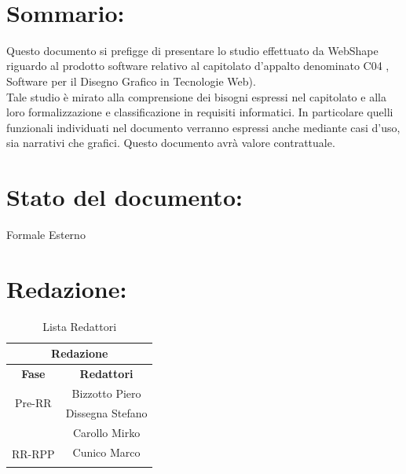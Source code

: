 \newpage


\begin{center} %
	\begin{Huge}	
				\textbf{\TITOLODOC}
			\\
	\end{Huge}
\end{center}
\parindent=18pt %
\section*{\LARGE Sommario:} %
Questo documento si prefigge di presentare lo studio effettuato da WebShape riguardo al prodotto software relativo al capitolato d'appalto denominato C04 {\ajax}, Software per il Disegno Grafico in Tecnologie Web).\\
Tale studio \`e mirato alla comprensione dei bisogni espressi nel capitolato e alla loro formalizzazione e classificazione in requisiti informatici. In particolare quelli funzionali individuati nel documento verranno espressi anche mediante casi d'uso, sia narrativi che grafici. Questo documento avr\`a valore contrattuale.

\section*{\LARGE Stato del documento:}
	Formale Esterno
\hangindent=0pt

\section*{\LARGE Redazione:}
	\begin{table}[!h]
		\begin{center}
			\begin{tabular}
				{|c|c|}
				\hline
				\multicolumn{2}{|c|}{ \textbf{Redazione} } \\
				\hline
				\textbf{Fase} & \textbf{Redattori} \\
				\hline
				\multirow{2}{*}{Pre-RR} & Bizzotto Piero\\
										& Dissegna Stefano\\
										& Carollo Mirko\\
				\hline
				\multirow{2}{*}{RR-RPP} & Cunico Marco\\
										& \\
				\hline
			\end{tabular}
			\caption{Lista Redattori} %
			\label{tabredazione}
		\end{center}
	\end{table}	

